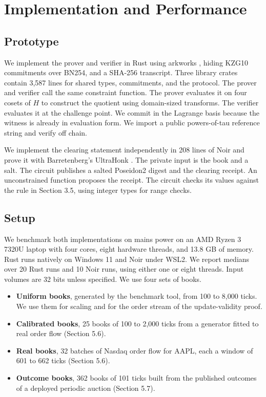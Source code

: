 
\section{Implementation and Performance}

\subsection{Prototype}

We implement the prover and verifier in Rust using arkworks \cite{arkworks}, hiding KZG10 commitments over BN254, and a SHA-256 transcript. Three library crates contain 3,587 lines for shared types, commitments, and the protocol. The prover and verifier call the same constraint function. The prover evaluates it on four cosets of \(H\) to construct the quotient using domain-sized transforms. The verifier evaluates it at the challenge point. We commit in the Lagrange basis because the witness is already in evaluation form. We import a public powers-of-tau reference string \cite{nikolaenko2024} and verify off chain.

We implement the clearing statement independently in 208 lines of Noir \cite{noir} and prove it with Barretenberg's UltraHonk \cite{barretenberg}. The private input is the book and a salt. The circuit publishes a salted Poseidon2 digest \cite{poseidon2} and the clearing receipt. An unconstrained function proposes the receipt. The circuit checks its values against the rule in Section 3.5, using integer types for range checks.

\subsection{Setup}

We benchmark both implementations on mains power on an AMD Ryzen 3 7320U laptop with four cores, eight hardware threads, and 13.8 GB of memory. Rust runs natively on Windows 11 and Noir under WSL2. We report medians over 20 Rust runs and 10 Noir runs, using either one or eight threads. Input volumes are 32 bits unless specified. We use four sets of books.

\begin{itemize}
\item
  \textbf{Uniform books}, generated by the benchmark tool, from 100 to 8,000 ticks. We use them for scaling and for the order stream of the update-validity proof.
\item
  \textbf{Calibrated books}, 25 books of 100 to 2,000 ticks from a generator fitted to real order flow (Section 5.6).
\item
  \textbf{Real books}, 32 batches of Nasdaq order flow for AAPL, each a window of 601 to 662 ticks (Section 5.6).
\item
  \textbf{Outcome books}, 362 books of 101 ticks built from the published outcomes of a deployed periodic auction (Section 5.7).
\end{itemize}


